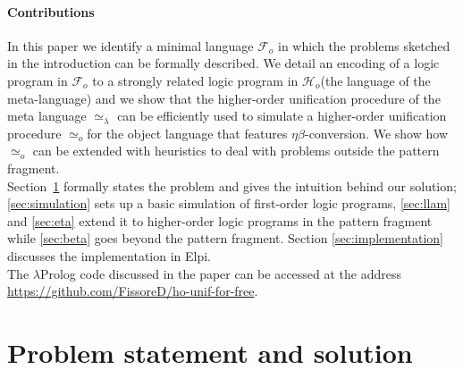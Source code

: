 \documentclass[sigconf,natbib=false,review]{acmart}
\def\githubUrl{\url{https://github.com/FissoreD/ho-unif-for-free}}
\newcommand{\UnifRel}{\ensuremath{\simeq}}
\newcommand{\Uo}{\texorpdfstring{\ensuremath{\UnifRel_o}\xspace}{unif\_o}}
\newcommand{\Ue}{\ensuremath{\UnifRel_\lambda}\xspace}
\newcommand{\llambda}{\ensuremath{\mathcal{L}}\xspace}
\newcommand{\Fo}{\texorpdfstring{\ensuremath{\mathcal{F}_{\!o}\xspace}}{Fo}} %
\newcommand{\Ho}{\texorpdfstring{\ensuremath{\mathcal{H}_o}\xspace}{Ho}}
\begin{document}
\paragraph{Contributions}
In this paper we identify a minimal language \Fo{} in which the problems
sketched in the introduction can be formally described.
We detail an encoding of a logic program in \Fo{} to a strongly related
logic program in \Ho (the language of the meta-language) and we show that
the higher-order unification procedure of the meta language \Ue{} can be
efficiently used to simulate a higher-order unification procedure \Uo for
the object language that features $\eta\beta$-conversion. We show how \Uo
can be extended with heuristics to deal with problems outside the pattern
fragment.\\
Section~\ref{sec:problem-statement} formally states the problem and gives the
intuition behind our solution; \cref{sec:simulation} sets up a basic
simulation of first-order logic programs, \cref{sec:llam} and \cref{sec:eta}
extend it to higher-order logic programs in the pattern fragment
while \cref{sec:beta} goes beyond the pattern fragment.
Section \ref{sec:implementation} discusses the implementation in Elpi.\\
The $\lambda$Prolog code discussed in the paper can be accessed at the
address \githubUrl.

\section{Problem statement and solution} %
\label{sec:problem-statement}

\newcommand{\specunif}[3]{
  \{#3_1, #3_2\} \subseteq \llambda \Rightarrow %
    \exists \rho, %
      \rho #3_1 #1 \rho #3_2  %
        \Leftrightarrow #3_1 #2 #3_2 \mapsto \rho' \subseteq \rho
}


\newcommand{\unifcorrectX}[4]{
   #4 \Rightarrow
      #3_1 #2 #3_2 \mapsto \rho
        \Rightarrow
          \rho #3_1 #1 \rho #3_2  %
}
\newcommand{\unifcorrect}[3]{\unifcorrectX{#1}{#2}{#3}{ \{#3_1, #3_2\} \subseteq \llambda}}

\newcommand{\unifcompleteX}[4]{
    #4 \Rightarrow
        \rho #3_1 #1 \rho #3_2  %
          \Rightarrow \exists \rho', #3_1 #2 #3_2 \mapsto \rho' \land \rho' \subseteq \rho
}
\newcommand{\unifcomplete}[3]{\unifcompleteX{#1}{#2}{#3}{\{#3_1, #3_2\} \subseteq \llambda}}
\end{document}
